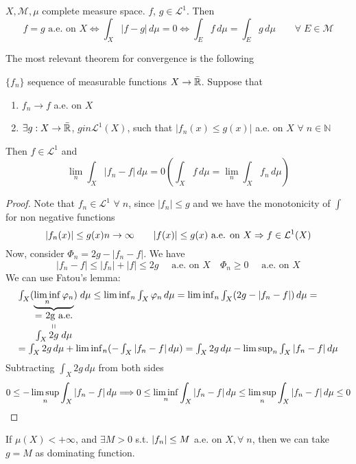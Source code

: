 \begin{theorem}
    \(X, \mathcal{M}, \mu\) complete measure space. \(f\), \(g \in \mathcal{L}^1\). Then
    \[
        f= g \text{ a.e. on } X \iff \int_X |f-g| \, d\mu =0 \iff \int_E f \, d\mu = \int_E g \, d\mu \qquad \forall \; E \in \mathcal{M} 
    \]
\end{theorem}
The most relevant theorem for convergence is the following
\begin{theorem}
    \(\{f_n\}\) sequence of measurable functions \(X \to \bar{\real}\). Suppose that
    \begin{enumerate}
        \item \(f_n \to f \) a.e. on \(X\)
        \item \(\exists g : X \to \bar{\real }\), \(g in \mathcal{L}^1(X)\), such that \(|f_n(x) \leq g(x)|\) a.e. on \(X\) \(\forall \; n \in \mathbb{N}\)
    \end{enumerate}
    Then \(f \in \mathcal{L}^1\) and 
    \[
        \lim_n \int_X |f_n -f| \, d\mu = 0 \left( \int_X f \, d\mu = \lim_n \int_X f_n \, d\mu \right)  
    \]
\end{theorem}
\begin{proof}
    Note that \(f_n \in \mathcal{L}^1\) \(\forall \; n\), since \(|f_n| \leq g\) and we have the monotonicity of \(\int\) for non negative functions
    \[
        |f_n(x)| \leq g(x) \\
        n \to \infty \qquad |f(x)| \leq g(x) \text{ a.e. on } X \\
        \Rightarrow f \in \mathcal{L}^1(X)
    \]  
    Now, consider \(\Phi_n = 2g - |f_n - f|\). We have
    \[
        |f_n-f| \leq |f_n|+|f| \leq 2g \quad \text{ a.e. on }X \quad \Phi_n \geq 0 \quad \text{ a.e. on }X  
    \]
    We can use Fatou's lemma:
    \[\begin{array}{l}
        \int_X (\underbrace{\liminf_n \phi_n}_{\stackbelowlittle{\mbox{= 2g a.e.}}{\int_X 2g \; d\mu}}) \; d\mu \leq \liminf_n \int_X \phi_n \, d\mu = \liminf_n \int_X (2g - \abs{f_n - f}) \, d\mu = \\
        = \int_X 2g \, d\mu + \liminf_n (-\int_X \abs{f_n - f} \, d\mu) =\int_X 2g \, d\mu - \limsup_n \int_X \abs{f_n - f} \, d\mu
    \end{array}
    \]
    Subtracting \(\int_X 2g \, d\mu\) from both sides 
    \[
        0 \leq -\limsup_n \int_X \abs{f_n - f} \, d\mu \Longrightarrow 0 \leq \liminf_n \int_X \abs{f_n - f} \, d\mu \leq \limsup_n \int_X \abs{f_n - f} \, d\mu \leq 0 
    \]  
\end{proof}
\begin{remark}
    If \(\mu(X) < +\infty\), and \(\exists M > 0\) s.t. \(\abs{f_n} \leq M\) a.e. on \(X, \forall \; n\), then we can take \(g = M\) as dominating function.
\end{remark}

